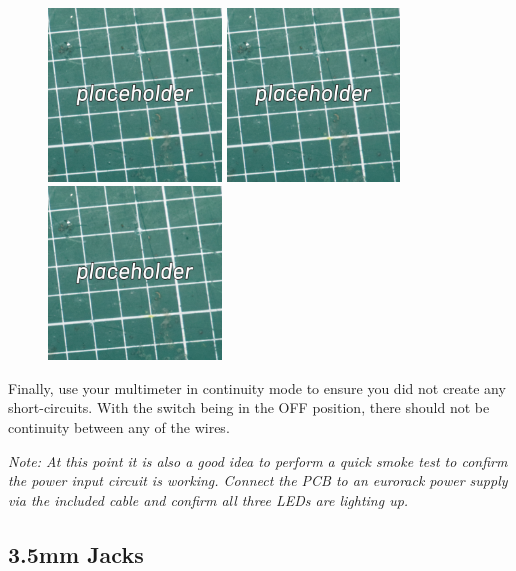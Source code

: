 \documentclass[12pt, a4paper]{article}
\begin{document}
\begin{figure}[H]
    \centering
    \includegraphics[width=46mm]{images/placeholder.jpg}
    \hspace{2mm}
    \includegraphics[width=46mm]{images/placeholder.jpg}
    \hspace{2mm}
    \includegraphics[width=46mm]{images/placeholder.jpg}
\end{figure}

Finally, use your multimeter in continuity mode to ensure you did not create any short-circuits.
With the switch being in the OFF position, there should not be continuity between any of the
wires.

\textit{%
    Note: At this point it is also a good idea to perform a quick smoke test to confirm the
    power input circuit is working. Connect the PCB to an eurorack power supply via the included
    cable and confirm all three LEDs are lighting up.
}

\subsection{3.5mm Jacks}
\end{document}
